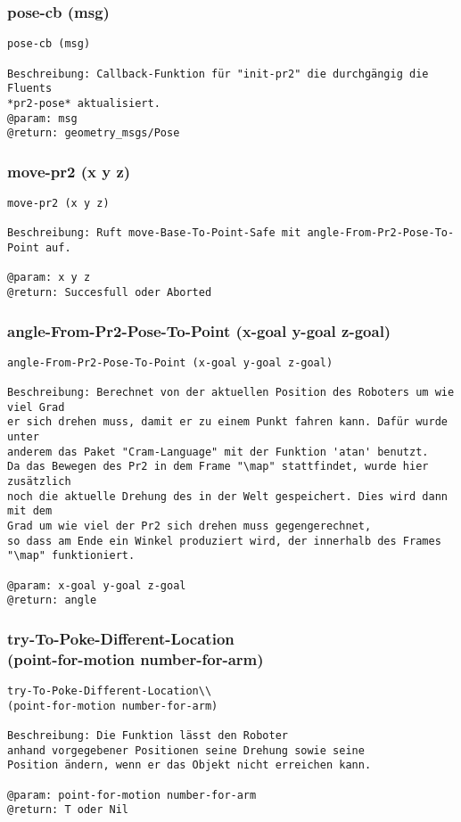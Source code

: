 \documentclass{suturo}
\begin{document}
\subsubsection{pose-cb (msg)}
\begin{verbatim}
pose-cb (msg)

Beschreibung: Callback-Funktion für "init-pr2" die durchgängig die Fluents
*pr2-pose* aktualisiert.
@param: msg
@return: geometry_msgs/Pose
\end{verbatim}

\subsubsection{move-pr2 (x y z)}
\begin{verbatim}
move-pr2 (x y z)

Beschreibung: Ruft move-Base-To-Point-Safe mit angle-From-Pr2-Pose-To-Point auf.

@param: x y z 
@return: Succesfull oder Aborted
\end{verbatim}

\subsubsection{angle-From-Pr2-Pose-To-Point (x-goal y-goal z-goal)}
\begin{verbatim}
angle-From-Pr2-Pose-To-Point (x-goal y-goal z-goal)

Beschreibung: Berechnet von der aktuellen Position des Roboters um wie viel Grad
er sich drehen muss, damit er zu einem Punkt fahren kann. Dafür wurde unter 
anderem das Paket "Cram-Language" mit der Funktion 'atan' benutzt. 
Da das Bewegen des Pr2 in dem Frame "\map" stattfindet, wurde hier zusätzlich 
noch die aktuelle Drehung des in der Welt gespeichert. Dies wird dann mit dem 
Grad um wie viel der Pr2 sich drehen muss gegengerechnet, 
so dass am Ende ein Winkel produziert wird, der innerhalb des Frames "\map" funktioniert.

@param: x-goal y-goal z-goal 
@return: angle 
\end{verbatim}


\subsubsection{try-To-Poke-Different-Location\\
(point-for-motion number-for-arm)}
\begin{verbatim}
try-To-Poke-Different-Location\\
(point-for-motion number-for-arm)

Beschreibung: Die Funktion lässt den Roboter 
anhand vorgegebener Positionen seine Drehung sowie seine
Position ändern, wenn er das Objekt nicht erreichen kann.

@param: point-for-motion number-for-arm
@return: T oder Nil


\end{verbatim}
\end{document}
